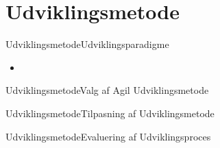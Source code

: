 \section*{Udviklingsmetode}

\begin{frame}{Udviklingsmetode}{Udviklingsparadigme}

\begin{itemize}
	\item 
\end{itemize}

\end{frame}

\begin{frame}{Udviklingsmetode}{Valg af Agil Udviklingsmetode}



\end{frame}

\begin{frame}{Udviklingsmetode}{Tilpasning af Udviklingsmetode}
	
\end{frame}

\begin{frame}{Udviklingsmetode}{Evaluering af Udviklingsproces}
	
\end{frame}